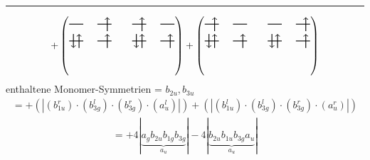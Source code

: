 \documentclass{article}
\begin{document}
\hrule\newpage 
\[ +\left(\text{\begin{tikzpicture}
    \draw[thick] (0,0) -- (0.5,0); %
    \draw[thick] (1,0) -- (1.5,0); %
    \draw[thick] (0,-0.6) -- (0.5,-0.6); %
    \draw[thick] (1,-0.6) -- (1.5,-0.6); %
\draw[->, thick] (1.35, -0.25) -- (1.35, 0.25); 
\draw[-> , thick] (0.35, -0.85) -- (0.35, -0.35); 
\draw[<- , thick] (0.15, -0.85) -- (0.15, -0.35); 
 \draw[-> , thick] (1.35, -0.85) -- (1.35, -0.35); 
\end{tikzpicture}\qquad \begin{tikzpicture}
    \draw[thick] (0,0) -- (0.5,0); %
    \draw[thick] (1,0) -- (1.5,0); %
    \draw[thick] (0,-0.6) -- (0.5,-0.6); %
    \draw[thick] (1,-0.6) -- (1.5,-0.6); %
\draw[->, thick] (0.35, -0.25) -- (0.35, 0.25); 
\draw[-> , thick] (0.35, -0.85) -- (0.35, -0.35); 
\draw[<- , thick] (0.15, -0.85) -- (0.15, -0.35); 
 \draw[-> , thick] (1.35, -0.85) -- (1.35, -0.35); 
\end{tikzpicture}}\right)+\left(\text{\begin{tikzpicture}
    \draw[thick] (0,0) -- (0.5,0); %
    \draw[thick] (1,0) -- (1.5,0); %
    \draw[thick] (0,-0.6) -- (0.5,-0.6); %
    \draw[thick] (1,-0.6) -- (1.5,-0.6); %
\draw[->, thick] (0.35, -0.25) -- (0.35, 0.25); 
\draw[-> , thick] (0.35, -0.85) -- (0.35, -0.35); 
\draw[<- , thick] (0.15, -0.85) -- (0.15, -0.35); 
 \draw[-> , thick] (1.35, -0.85) -- (1.35, -0.35); 
\end{tikzpicture}\qquad \begin{tikzpicture}
    \draw[thick] (0,0) -- (0.5,0); %
    \draw[thick] (1,0) -- (1.5,0); %
    \draw[thick] (0,-0.6) -- (0.5,-0.6); %
    \draw[thick] (1,-0.6) -- (1.5,-0.6); %
\draw[->, thick] (1.35, -0.25) -- (1.35, 0.25); 
\draw[-> , thick] (0.35, -0.85) -- (0.35, -0.35); 
\draw[<- , thick] (0.15, -0.85) -- (0.15, -0.35); 
 \draw[-> , thick] (1.35, -0.85) -- (1.35, -0.35); 
\end{tikzpicture}}\right)\]enthaltene Monomer-Symmetrien = $b_{2u},b_{3u}$\begin{multline*}=+\left(\left|(b_{1u}^{r}) \cdot (b_{3g}^{l}) \cdot (b_{3g}^{r}) \cdot (a_{u}^{l})\right|\right)+\left(\left|(b_{1u}^{l}) \cdot (b_{3g}^{l}) \cdot (b_{3g}^{r}) \cdot (a_{u}^{r})\right|\right)\end{multline*}
\begin{multline*}
=+4\left|\underbrace{a_{g} b_{2u} b_{1g} b_{3g}}_{a_{u}}\right|-4\left|\underbrace{b_{2u} b_{1u} b_{3g} a_{u}}_{a_{u}}\right|
\end{multline*}
\\\\
\end{document}
